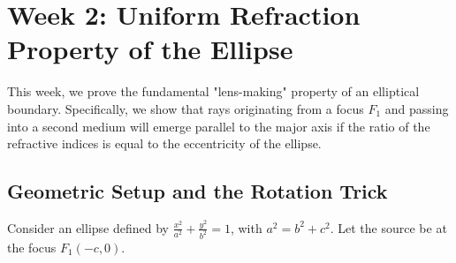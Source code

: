 \documentclass{article}
\begin{document}
\section{Week 2: Uniform Refraction Property of the Ellipse}

This week, we prove the fundamental "lens-making" property of an elliptical boundary. Specifically, we show that rays originating from a focus $F_1$ and passing into a second medium will emerge parallel to the major axis if the ratio of the refractive indices is equal to the eccentricity of the ellipse.

\subsection{Geometric Setup and the Rotation Trick}
Consider an ellipse defined by $\frac{x^2}{a^2} + \frac{y^2}{b^2} = 1$, with $a^2 = b^2 + c^2$. Let the source be at the focus $F_1(-c, 0)$.
\end{document}
